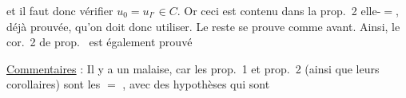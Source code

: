 et il faut donc vérifier $u_0=u_{I'}\in C$. Or ceci est contenu dans la prop.~2 elle-$=$, déjà prouvée, qu’on doit donc utiliser. Le reste se prouve comme avant. Ainsi, le cor.~2 de prop.~ est également prouvé

\uline{Commentaires} : Il y a un malaise, car les prop.~1 et prop.~2  (ainsi que leurs corollaires) sont  les $=$ , avec des hypothèses  qui sont
